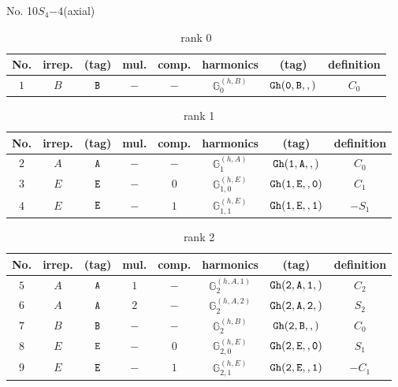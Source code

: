 \documentclass[fleqn,8pt]{jsarticle}
\begin{document}
\setcounter{MaxMatrixCols}{16}

\begin{center}
\LARGE
No. 10\quad$S_{4}$\quad$-4$\quad[ tetragonal ] (axial)
\end{center}
\begin{table}[ht!]
\begin{center}
\caption{rank 0}
\renewcommand{\arraystretch}{1.3}
\begin{tabular}{cccccccc} \hline \hline
No. & irrep. & (tag) & mul. & comp. & harmonics & (tag) & definition \\ \hline
$ 1 $ & $ B $ & $ {\tt B} $ & $ - $ & $ - $ & $ \mathbb{G}_{0}^{(h,B)} $ & $ {\tt Gh(0,B,,)} $ & $ C_{0} $ \\
 \hline \hline
\end{tabular}
\end{center}
\end{table}
\begin{table}[ht!]
\begin{center}
\caption{rank 1}
\renewcommand{\arraystretch}{1.3}
\begin{tabular}{cccccccc} \hline \hline
No. & irrep. & (tag) & mul. & comp. & harmonics & (tag) & definition \\ \hline
$ 2 $ & $ A $ & $ {\tt A} $ & $ - $ & $ - $ & $ \mathbb{G}_{1}^{(h,A)} $ & $ {\tt Gh(1,A,,)} $ & $ C_{0} $ \\
$ 3 $ & $ E $ & $ {\tt E} $ & $ - $ & $ 0 $ & $ \mathbb{G}_{1,0}^{(h,E)} $ & $ {\tt Gh(1,E,,0)} $ & $ C_{1} $ \\
$ 4 $ & $ E $ & $ {\tt E} $ & $ - $ & $ 1 $ & $ \mathbb{G}_{1,1}^{(h,E)} $ & $ {\tt Gh(1,E,,1)} $ & $ - S_{1} $ \\
 \hline \hline
\end{tabular}
\end{center}
\end{table}
\begin{table}[ht!]
\begin{center}
\caption{rank 2}
\renewcommand{\arraystretch}{1.3}
\begin{tabular}{cccccccc} \hline \hline
No. & irrep. & (tag) & mul. & comp. & harmonics & (tag) & definition \\ \hline
$ 5 $ & $ A $ & $ {\tt A} $ & $ 1 $ & $ - $ & $ \mathbb{G}_{2}^{(h,A,1)} $ & $ {\tt Gh(2,A,1,)} $ & $ C_{2} $ \\
$ 6 $ & $ A $ & $ {\tt A} $ & $ 2 $ & $ - $ & $ \mathbb{G}_{2}^{(h,A,2)} $ & $ {\tt Gh(2,A,2,)} $ & $ S_{2} $ \\
$ 7 $ & $ B $ & $ {\tt B} $ & $ - $ & $ - $ & $ \mathbb{G}_{2}^{(h,B)} $ & $ {\tt Gh(2,B,,)} $ & $ C_{0} $ \\
$ 8 $ & $ E $ & $ {\tt E} $ & $ - $ & $ 0 $ & $ \mathbb{G}_{2,0}^{(h,E)} $ & $ {\tt Gh(2,E,,0)} $ & $ S_{1} $ \\
$ 9 $ & $ E $ & $ {\tt E} $ & $ - $ & $ 1 $ & $ \mathbb{G}_{2,1}^{(h,E)} $ & $ {\tt Gh(2,E,,1)} $ & $ - C_{1} $ \\
 \hline \hline
\end{tabular}
\end{center}
\end{table}
\end{document}
